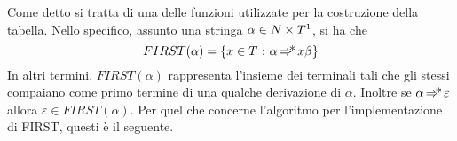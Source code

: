 \documentclass{subfiles}
\begin{document}
Come detto si tratta di una delle funzioni utilizzate per la costruzione della tabella.
Nello specifico, assunto una stringa $\alpha \in N \times T\footnotemark[1]$, si ha che
$$
    FIRST(\alpha) = \Set{x \in T}[\alpha \Derivation x\beta]
$$
In altri termini, $FIRST(\alpha)$ rappresenta l'insieme dei terminali tali che gli stessi compaiano come primo termine di una qualche derivazione di $\alpha$.
Inoltre se $\alpha \operatorname{\Rightarrow\hspace{-5pt}*} \varepsilon$ allora $\varepsilon \in FIRST(\alpha)$.
Per quel che concerne l'algoritmo per l'implementazione di FIRST, questi è il seguente.

\end{document}
